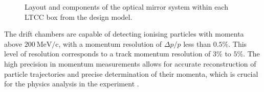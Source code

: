     \begin{wrapfigure}{l}{0.50\textwidth}
        \caption[LTCC Mirror System]
        {Layout and components of the optical mirror system within each LTCC box from the design model.}
        \label{fig::11.213::ltcc}
    \end{wrapfigure}

    The drift chambers are capable of detecting ionising particles with momenta above $200 ~\text{MeV}/\text{c}$, with a momentum resolution of $\Delta p/p$ less than $0.5\%$. This level of resolution corresponds to a track momentum resolution of $3\%$ to $5\%$.
    The high precision in momentum measurements allows for accurate reconstruction of particle trajectories and precise determination of their momenta, which is crucial for the physics analysis in the experiment \cite{mestayer2020}.
